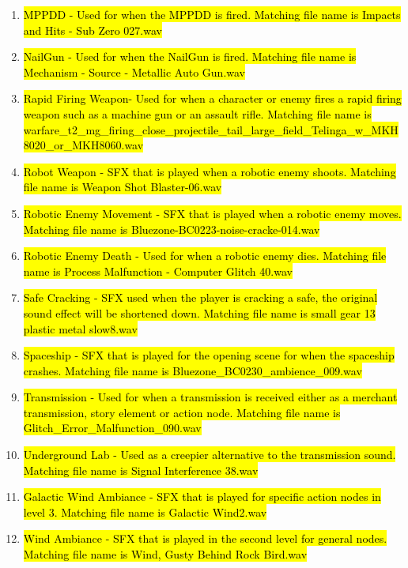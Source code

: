 \documentclass{article}
\begin{document}
\begin{enumerate}
	\item \hl{MPPDD - Used for when the MPPDD is fired. Matching file name is Impacts and Hits - Sub Zero 027.wav}
	\item \hl{NailGun - Used for when the NailGun is fired. Matching file name is Mechanism - Source - Metallic Auto Gun.wav}
	\item \hl{Rapid Firing Weapon- Used for when a character or enemy fires a rapid firing weapon such as a machine gun or an assault rifle. Matching file name is warfare\_t2\_mg\_firing\_close\_projectile\_tail\_large\_field\_Telinga\_w\_MKH8020\_or\_MKH8060.wav}
	\item \hl{Robot Weapon - SFX that is played when a robotic enemy shoots. Matching file name is Weapon Shot Blaster-06.wav}
	\item \hl{Robotic Enemy Movement - SFX that is played when a robotic enemy moves. Matching file name is Bluezone-BC0223-noise-cracke-014.wav}
	\item \hl{Robotic Enemy Death - Used for when a robotic enemy dies. Matching file name is Process Malfunction - Computer Glitch 40.wav}
	\item \hl{Safe Cracking - SFX used when the player is cracking a safe, the original sound effect will be shortened down. Matching file name is small gear 13 plastic metal slow8.wav}
	\item \hl{Spaceship - SFX that is played for the opening scene for when the spaceship crashes. Matching file name is Bluezone\_BC0230\_ambience\_009.wav}
	\item \hl{Transmission - Used for when a transmission is received either as a merchant transmission, story element or action node. Matching file name is Glitch\_Error\_Malfunction\_090.wav}
	\item \hl{Underground Lab - Used as a creepier alternative to the transmission sound. Matching file name is Signal Interference 38.wav}
	\item \hl{Galactic Wind Ambiance - SFX that is played for specific action nodes in level 3. Matching file name is Galactic Wind2.wav}
	\item \hl{Wind Ambiance - SFX that is played in the second level for general nodes. Matching file name is Wind, Gusty Behind Rock Bird.wav}
\end{enumerate}
\end{document}
